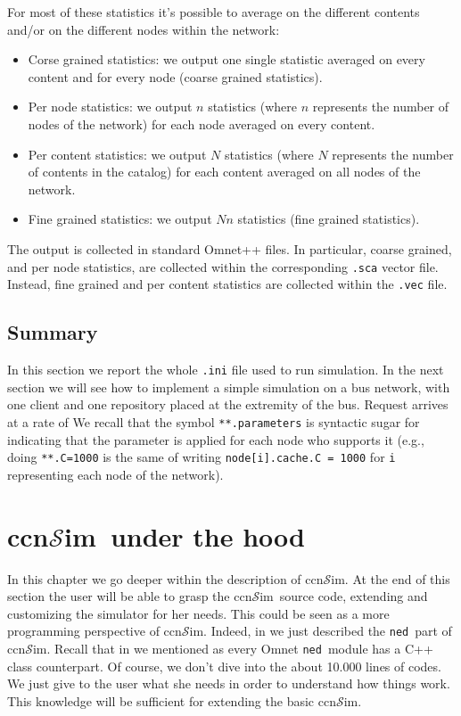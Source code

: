 \documentclass{book}
\newcommand{\ccnsim}{ccn$\mathcal{S}$im}
\newcommand{\ned}{\texttt{ned}}
\begin{document}
For most of these statistics it's possible to average on the different contents and/or on the different nodes within the network:
\begin{itemize}
    \item Corse grained statistics: we output one single statistic averaged on every content and for every node (coarse grained statistics).
    \item Per node statistics: we output $n$ statistics (where $n$ represents the number of nodes of the network) for each node averaged on every content.
    \item Per content statistics: we output $N$ statistics (where $N$ represents the number of contents in the catalog) for each content averaged on all nodes of the network.
    \item Fine grained statistics: we output $Nn$ statistics (fine grained statistics). 
\end{itemize}
The output is collected in standard Omnet++ files. In particular, coarse grained, and per node statistics, are collected within the corresponding \verb|.sca| vector file. Instead, fine grained and per content statistics are collected within the \verb|.vec| file. 

\section{Summary}
In this section we report the whole \verb|.ini| file used to run simulation. In the next section we will see how to implement a simple simulation on a bus network, with one client and one repository placed at the extremity of the bus. Request arrives at a rate of We recall that the symbol \verb|**.parameters| is syntactic sugar for indicating that the parameter is applied for each node who supports it (e.g., doing \verb|**.C=1000| is the same of writing \verb|node[i].cache.C = 1000| for \verb|i| representing each node of the network). 

\chapter{\ccnsim\ under the hood}\label{ch:hood}
In this chapter we go deeper within the description of \ccnsim. At the end of this section the user will be able to grasp the \ccnsim\ source code, extending and customizing the simulator for her needs. This could be seen as a more programming perspective of \ccnsim. Indeed, in  we just described the \ned\ part of \ccnsim. Recall that in  we mentioned as every Omnet \ned\ module has a C++ class counterpart. Of course, we don't dive into the about 10.000 lines of codes. We just give to the user what she needs in order to understand how things work. This knowledge will be sufficient for extending the basic \ccnsim. 
\end{document}
